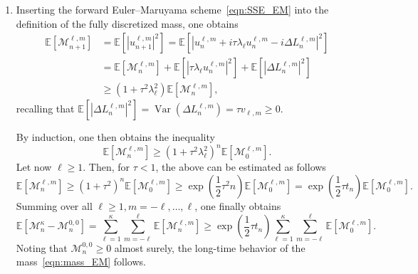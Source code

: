 \documentclass[11pt]{amsart}
\newcommand{\E}{{\mathbb E}}
\newcommand{\cM}{\mathcal M}
\newcommand{\expp}[1]{\exp\left(#1\right)}
\DeclareMathOperator{\Var}{Var}
\begin{document}
\begin{appendixproof}
\begin{enumerate}[label=\roman*)]
\item \label{pf-spectral-mass} Inserting the forward Euler--Maruyama scheme~\eqref{eqn:SSE_EM} into the definition of the fully discretized mass, one obtains
\begin{align*}
    \E\left[\cM_{n+1}^{\ell,m}\right] &= \E\left[\left\lvert u_{n+1}^{\ell,m} \right\rvert^2\right] = \E\left[\left\lvert u_n^{\ell,m} + i\tau \lambda_\ell u_n^{\ell,m} - i\Delta L^{\ell, m}_n \right\rvert^2\right]\\
    &=\E\left[\cM_{n}^{\ell,m}\right] + \E\left[\left\lvert \tau \lambda_\ell u_{n}^{\ell,m}\right\rvert^2\right] + \E\left[\left\lvert \Delta L^{\ell, m}_n \right\rvert^2\right]\\
    & \geq (1+\tau^2 \lambda_\ell^2)\E\left[\cM_{n}^{\ell,m}\right],
\end{align*}
recalling that $\E\left[\left\lvert \Delta L^{\ell, m}_n \right\rvert^2\right] = \Var(\Delta L^{\ell, m}_n) = \tau v_{\ell, m} \geq 0$.

By induction, one then obtains the inequality
\begin{equation*}
    \E\left[\cM_{n}^{\ell,m}\right] \geq (1+\tau^2 \lambda_\ell^2)^n\E\left[\cM_{0}^{\ell,m}\right].
\end{equation*}
Let now $\ell \geq 1$. Then, for $\tau < 1$, the above can be estimated as follows
\begin{equation*}
    \E\left[\cM_{n}^{\ell,m}\right]
    \geq (1+\tau^2)^n\E\left[\cM_{0}^{\ell,m}\right] \geq \expp{\frac{1}{2}\tau^2 n}\E\left[\cM_{0}^{\ell,m}\right] = \expp{\frac{1}{2}\tau t_n}\E\left[\cM_{0}^{\ell,m}\right].
\end{equation*}
Summing over all $\ell \geq 1, m = -\ell, \dots, \ell$, one finally obtains
\begin{equation*}
    \E\left[\cM^\kappa_n - \cM^{0,0}_n\right] = \sum_{\ell=1}^{\kappa}\sum_{m=-\ell}^{\ell}\E\left[\cM^{\ell,m}_n\right] \geq \expp{\frac{1}{2}\tau t_n} \sum_{\ell=1}^{\kappa}\sum_{m=-\ell}^{\ell} \E\left[\cM_{0}^{\ell,m}\right].
\end{equation*}
Noting that $\cM^{0,0}_n \geq 0$ almost surely, the long-time behavior of the mass~\eqref{eqn:mass_EM} follows.


\end{enumerate}
\end{appendixproof}
\end{document}
